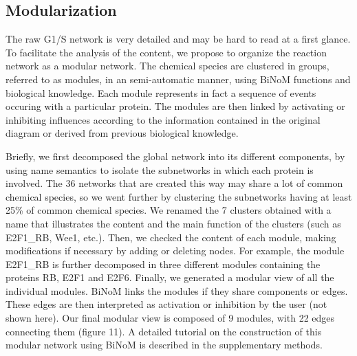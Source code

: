 \documentclass[10pt]{bmc_article}
\newenvironment{bmcformat}{\baselineskip20pt\sloppy\setboolean{publ}{false}}{\baselineskip20pt\sloppy}
\begin{document}
\begin{bmcformat}

\subsection*{Modularization}

The raw G1/S network is very detailed and may be hard to read at a first glance.
To facilitate the analysis of the content, we propose to organize the reaction
network as a modular network. The chemical species are clustered in groups, referred to
as modules, in an semi-automatic manner, using BiNoM functions and biological
knowledge. Each module represents in fact a
sequence of events occuring with a particular protein. The modules are then
linked by activating or inhibiting influences according to the information
contained in the original diagram or derived from previous biological knowledge.

Briefly, we first decomposed the global network into its different components,
by using name semantics to isolate the subnetworks in which
each protein is involved. The 36 networks that are created this way may share a
lot of common chemical species, so we went further
by clustering the subnetworks having at least 25\% of common chemical species. We renamed
the 7 clusters obtained with a name that illustrates the content and the main
function of the clusters (such as E2F1\_RB, Wee1, etc.). Then, we checked the
content of each module, making modifications if necessary by adding or deleting nodes.
For example, the module E2F1\_RB is
further decomposed in three different modules containing the proteins RB, E2F1
and E2F6. Finally, we generated a modular view of all the individual modules.
BiNoM links the modules if they share components or edges. These edges are then
interpreted as activation or inhibition by the user (not shown here). Our final
modular view is composed of 9 modules, with 22
edges connecting them (figure 11). A detailed tutorial on the
construction of this modular network using BiNoM is described in the
supplementary methods.





\end{bmcformat}
\end{document}
